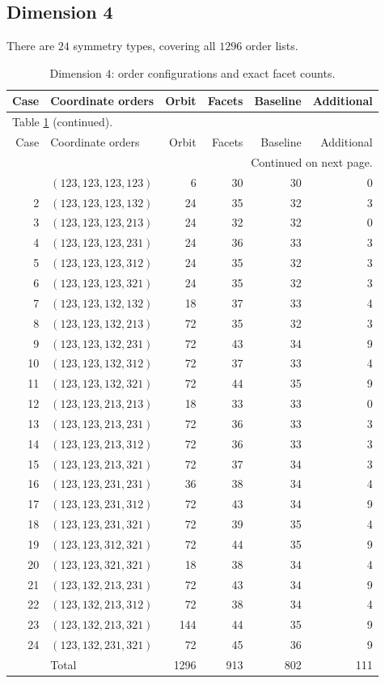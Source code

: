\documentclass[a4paper,11pt]{amsart}
\numberwithin{equation}{section}
\theoremstyle{definition}
\theoremstyle{remark}
\begin{document}
\subsection{Dimension 4}\label{app:tables-n4}
There are $ 24$ symmetry types, covering all $ 1296$ order lists.
{\small\setlength{\tabcolsep}{4.5pt}
\begin{longtable}{@{}rlrrrr@{}}
\caption{Dimension $ 4$: order configurations and exact facet counts.}\label{tab:counts-n4}\\
\toprule
Case & Coordinate orders & Orbit & Facets & Baseline & Additional\\
\midrule\endfirsthead
\multicolumn{6}{l}{\small Table \ref{tab:counts-n4} (continued).}\\
\toprule
Case & Coordinate orders & Orbit & Facets & Baseline & Additional\\
\midrule\endhead
\midrule
\multicolumn{6}{r}{\small Continued on next page.}\\
\endfoot\bottomrule\endlastfoot
1 & $(123,123,123,123)$ & 6 & 30 & 30 & 0\\
2 & $(123,123,123,132)$ & 24 & 35 & 32 & 3\\
3 & $(123,123,123,213)$ & 24 & 32 & 32 & 0\\
4 & $(123,123,123,231)$ & 24 & 36 & 33 & 3\\
5 & $(123,123,123,312)$ & 24 & 35 & 32 & 3\\
6 & $(123,123,123,321)$ & 24 & 35 & 32 & 3\\
7 & $(123,123,132,132)$ & 18 & 37 & 33 & 4\\
8 & $(123,123,132,213)$ & 72 & 35 & 32 & 3\\
9 & $(123,123,132,231)$ & 72 & 43 & 34 & 9\\
10 & $(123,123,132,312)$ & 72 & 37 & 33 & 4\\
11 & $(123,123,132,321)$ & 72 & 44 & 35 & 9\\
12 & $(123,123,213,213)$ & 18 & 33 & 33 & 0\\
13 & $(123,123,213,231)$ & 72 & 36 & 33 & 3\\
14 & $(123,123,213,312)$ & 72 & 36 & 33 & 3\\
15 & $(123,123,213,321)$ & 72 & 37 & 34 & 3\\
16 & $(123,123,231,231)$ & 36 & 38 & 34 & 4\\
17 & $(123,123,231,312)$ & 72 & 43 & 34 & 9\\
18 & $(123,123,231,321)$ & 72 & 39 & 35 & 4\\
19 & $(123,123,312,321)$ & 72 & 44 & 35 & 9\\
20 & $(123,123,321,321)$ & 18 & 38 & 34 & 4\\
21 & $(123,132,213,231)$ & 72 & 43 & 34 & 9\\
22 & $(123,132,213,312)$ & 72 & 38 & 34 & 4\\
23 & $(123,132,213,321)$ & 144 & 44 & 35 & 9\\
24 & $(123,132,231,321)$ & 72 & 45 & 36 & 9\\
\midrule
 & Total & 1296 & 913 & 802 & 111\\
\end{longtable}
}
\end{document}

